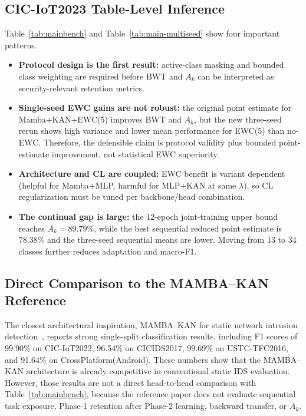 \documentclass[a4paper,fleqn]{cas-dc}
\begin{document}
\subsection{CIC-IoT2023 Table-Level Inference}
Table~\ref{tab:mainbench} and Table~\ref{tab:main-multiseed} show four important patterns.
\begin{itemize}
\item \textbf{Protocol design is the first result:} active-class masking and bounded class weighting are required before BWT and $A_k$ can be interpreted as security-relevant retention metrics.
\item \textbf{Single-seed EWC gains are not robust:} the original point estimate for Mamba+KAN+EWC(5) improves BWT and $A_k$, but the new three-seed rerun shows high variance and lower mean performance for EWC(5) than no-EWC. Therefore, the defensible claim is protocol validity plus bounded point-estimate improvement, not statistical EWC superiority.
\item \textbf{Architecture and CL are coupled:} EWC benefit is variant dependent (helpful for Mamba+MLP, harmful for MLP+KAN at same $\lambda$), so CL regularization must be tuned per backbone/head combination.
\item \textbf{The continual gap is large:} the 12-epoch joint-training upper bound reaches $A_k=89.79\%$, while the best sequential reduced point estimate is $78.38\%$ and the three-seed sequential means are lower. Moving from 13 to 34 classes further reduces adaptation and macro-F1.
\end{itemize}

\subsection{Direct Comparison to the MAMBA--KAN Reference}
The closest architectural inspiration, MAMBA--KAN for static network intrusion detection~\cite{zhao2025}, reports strong single-split classification results, including F1 scores of 99.90\% on CIC-IoT2022, 96.54\% on CICIDS2017, 99.69\% on USTC-TFC2016, and 91.64\% on CrossPlatform(Android). These numbers show that the MAMBA--KAN architecture is already competitive in conventional static IDS evaluation. However, those results are not a direct head-to-head comparison with Table~\ref{tab:mainbench}, because the reference paper does not evaluate sequential task exposure, Phase-1 retention after Phase-2 learning, backward transfer, or $A_k$.
\end{document}
